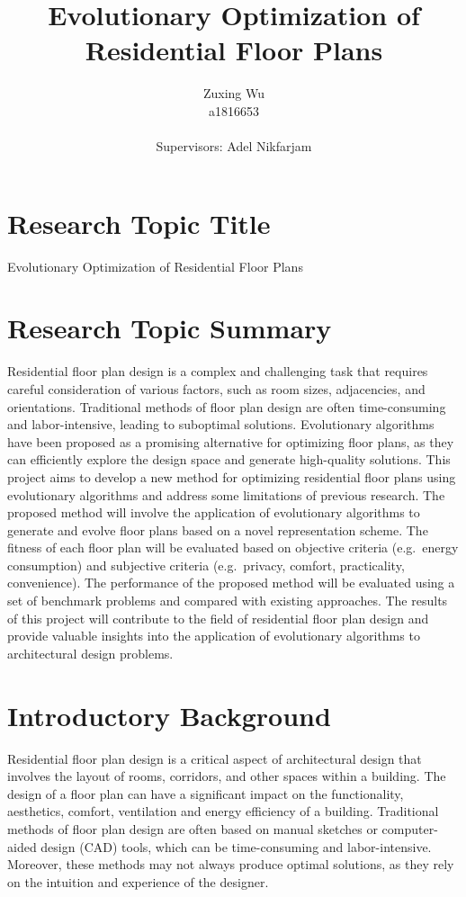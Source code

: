 \documentclass[]{article}
\title{Evolutionary Optimization of Residential Floor Plans}
\author{Zuxing Wu\\a1816653\\ \\Supervisors: Adel Nikfarjam\\ }
\begin{document}
\maketitle\nonumber

\newpage\nonumber

\tableofcontents

\newpage

\section{Research Topic Title} 
Evolutionary Optimization of Residential Floor Plans
\section{Research Topic Summary}

Residential floor plan design is a complex and challenging task that requires careful consideration of various factors, such as room sizes, adjacencies, and orientations. Traditional methods of floor plan design are often time-consuming and labor-intensive, leading to suboptimal solutions. Evolutionary algorithms have been proposed as a promising alternative for optimizing floor plans, as they can efficiently explore the design space and generate high-quality solutions. This project aims to develop a new method for optimizing residential floor plans using evolutionary algorithms and address some limitations of previous research. The proposed method will involve the application of evolutionary algorithms to generate and evolve floor plans based on a novel representation scheme. The fitness of each floor plan will be evaluated based on objective criteria (e.g.\ energy consumption) and subjective criteria (e.g.\ privacy, comfort, practicality, convenience). The performance of the proposed method will be evaluated using a set of benchmark problems and compared with existing approaches. The results of this project will contribute to the field of residential floor plan design and provide valuable insights into the application of evolutionary algorithms to architectural design problems.

\section{Introductory Background}
Residential floor plan design is a critical aspect of architectural design that involves the layout of rooms, corridors, and other spaces within a building. The design of a floor plan can have a significant impact on the functionality, aesthetics, comfort, ventilation and energy efficiency of a building. Traditional methods of floor plan design are often based on manual sketches or computer-aided design (CAD) tools, which can be time-consuming and labor-intensive. Moreover, these methods may not always produce optimal solutions, as they rely on the intuition and experience of the designer.
\end{document}
